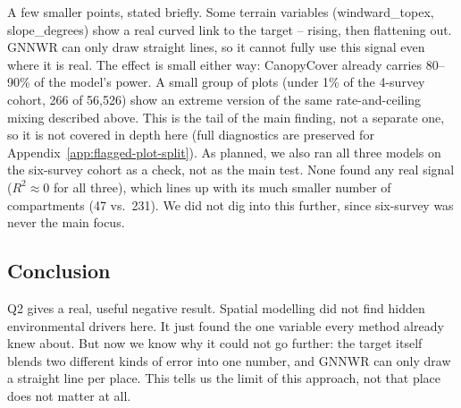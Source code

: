 

A few smaller points, stated briefly. Some terrain variables (windward\_topex, slope\_degrees) show a real curved link to the target -- rising, then flattening out. GNNWR can only draw straight lines, so it cannot fully use this signal even where it is real. The effect is small either way: CanopyCover already carries 80--90\% of the model's power. A small group of plots (under 1\% of the 4-survey cohort, 266 of 56,526) show an extreme version of the same rate-and-ceiling mixing described above. This is the tail of the main finding, not a separate one, so it is not covered in depth here (full diagnostics are preserved for Appendix~\ref{app:flagged-plot-split}). As planned, we also ran all three models on the six-survey cohort as a check, not as the main test. None found any real signal ($R^2\approx0$ for all three), which lines up with its much smaller number of compartments (47 vs.\ 231). We did not dig into this further, since six-survey was never the main focus.

\subsection*{Conclusion}
Q2 gives a real, useful negative result. Spatial modelling did not find hidden environmental drivers here. It just found the one variable every method already knew about. But now we know why it could not go further: the target itself blends two different kinds of error into one number, and GNNWR can only draw a straight line per place. This tells us the limit of this approach, not that place does not matter at all.
